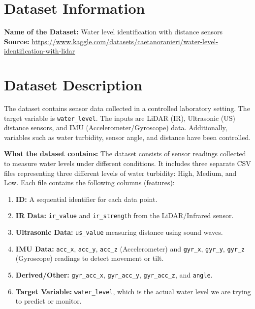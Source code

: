 \documentclass[12pt, a4paper]{article}
\begin{document}


\newpage           
\tableofcontents   
\newpage           

\section{Dataset Information}
\textbf{Name of the Dataset:} Water level identification with distance sensors \\
\textbf{Source:} \url{https://www.kaggle.com/datasets/caetanoranieri/water-level-identification-with-lidar}

\section{Dataset Description}
The dataset contains sensor data collected in a controlled laboratory setting. The target variable is \texttt{water\_level}. The inputs are LiDAR (IR), Ultrasonic (US) distance sensors, and IMU (Accelerometer/Gyroscope) data. Additionally, variables such as water  turbidity, sensor angle, and distance have been controlled.

\textbf{What the dataset contains:} The dataset consists of sensor readings collected to measure water levels under different conditions. It includes three separate CSV files representing three different levels of water turbidity: High, Medium, and Low. Each file contains the following columns (features):

\begin{enumerate}
    \item \textbf{ID:} A sequential identifier for each data point.
    \item \textbf{IR Data:} \texttt{ir\_value} and \texttt{ir\_strength} from the LiDAR/Infrared sensor.
    \item \textbf{Ultrasonic Data:} \texttt{us\_value} measuring distance using sound waves.
    \item \textbf{IMU Data:} \texttt{acc\_x}, \texttt{acc\_y}, \texttt{acc\_z} (Accelerometer) and \texttt{gyr\_x}, \texttt{gyr\_y}, \texttt{gyr\_z} (Gyroscope) readings to detect movement or tilt.
    \item \textbf{Derived/Other:} \texttt{gyr\_acc\_x}, \texttt{gyr\_acc\_y}, \texttt{gyr\_acc\_z}, and \texttt{angle}.
    \item \textbf{Target Variable:} \texttt{water\_level}, which is the actual water level we are trying to predict or monitor.
\end{enumerate}
\end{document}
